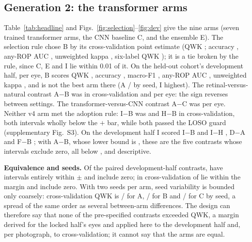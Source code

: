 \documentclass[journal]{IEEEtran}
\begin{document}
\subsection{Generation 2: the transformer arms}
Table~\ref{tab:headline} and Figs.~\ref{fig:selection}--\ref{fig:dev} give the nine arms (seven trained transformer arms, the CNN baseline C, and the ensemble E). The selection rule chose B by its cross-validation point estimate (QWK \BcvQ{} \BcvQci{}; accuracy \BcvAcc{}, any-ROP AUC \BcvAUC{}, unweighted kappa \BkappaUpooled{}, six-label QWK \BcvQsix{}); it is a tie broken by the rule, since C, E and I lie within 0.01 of it. On the held-out cohort's development half, per eye, B scores QWK \BdevQ{} \BdevQci{}, accuracy \BdevAcc{}, macro-F1 \BdevMF{}, any-ROP AUC \BdevAUC{}, unweighted kappa \BdevKappaUpooled{}, and is not the best arm there (A \devQAsA{}/\devQAsB{} by seed, I highest). The retinal-versus-natural contrast A$-$B was \cvDiffAB{} \cvDiffABci{} in cross-validation and \devDiffAB{} \devDiffABci{} per eye: the sign reverses between settings. The transformer-versus-CNN contrast A$-$C was \devDiffAC{} \devDiffACci{} per eye. Neither v4 arm met the adoption rule: I$-$B was \cvDiffIB{} \cvDiffIBci{} and H$-$B \cvDiffHB{} \cvDiffHBci{} in cross-validation, both intervals wholly below the $+$\marginCV{} bar, while both passed the LOSO guard (supplementary Fig.~S3). On the development half I scored I$-$B \devDiffIB{} \devDiffIBci{} and I$-$H \devDiffIH{} \devDiffIHci{}, D$-$A \devDiffDA{} \devDiffDAci{} and F$-$B \devDiffFB{} \devDiffFBci{}; with A$-$B, whose lower bound is \devDiffABloFour{}, these are the five contrasts whose intervals exclude zero, all below \mdd{}, and descriptive.

\textbf{Equivalence and seeds.} Of the \eqDevTotal{} paired development-half contrasts, \eqDevWithin{} have intervals entirely within $\pm$\mdd{} and \eqDevZero{} include zero; in cross-validation \eqCvWithin{} of \eqCvTotal{} lie within the margin and \eqCvZero{} include zero. With two seeds per arm, seed variability is bounded only coarsely: cross-validation QWK is \cvQAsA{}/\cvQAsB{} for A, \cvQBsA{}/\cvQBsB{} for B and \cvQCsA{}/\cvQCsB{} for C by seed, a spread of the same order as several between-arm differences. The design can therefore say that none of the \eqDevTotal{} pre-specified contrasts exceeded \mdd{} QWK, a margin derived for the locked half's \lockedEyes{} eyes and applied here to the development half and, per photograph, to cross-validation; it cannot say that the arms are equal.
\end{document}
